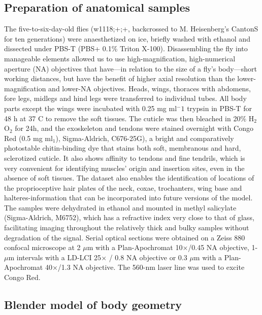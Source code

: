\documentclass[sn-mathphys-num]{sn-jnl}%
\theoremstyle{thmstyleone}%
\theoremstyle{thmstyletwo}%
\theoremstyle{thmstylethree}%
\begin{document}
\subsection{Preparation of anatomical samples}

The five-to-six-day-old flies (w1118;+;+, backcrossed to M. Heisenberg's CantonS for ten generations) were anaesthetized on ice, briefly washed with ethanol and dissected under PBS-T (PBS+ 0.1\% Triton X-100).
Disassembling the fly into manageable elements allowed us to use high-magnification, high-numerical aperture (NA) objectives that have—in relation to the size of a fly’s body—short working distances, but have the benefit of higher axial resolution than the lower-magnification and lower-NA objectives. 
Heads, wings, thoraces with abdomens, fore legs, midlegs and hind legs were transferred to individual tubes.
All body parts except the wings 
were incubated with 0.25 mg ml$ ^-1 $ trypsin in PBS-T for 48 h at 37 C to remove the soft tissues.
The cuticle was then bleached in 20\% H$ _2 $O$ _2 $ for 24h, and the exoskeleton and tendons were stained overnight with Congo Red (0.5 mg ml$ _1 $), Sigma-Aldrich, C676-25G), a bright and comparatively photostable chitin-binding dye that stains both soft, membranous and hard, sclerotized cuticle.
It also shows affinity to tendons and fine tendrils, which is very convenient for identifying muscles' origin and insertion sites, even in the absence of soft tissues.
The dataset also enables the identification of locations of the proprioceptive hair plates of the neck, coxae, trochanters, wing base and halteres-information that can be incorporated into future versions of the model. 
The samples were dehydrated in ethanol and mounted in methyl salicylate (Sigma-Aldrich, M6752), which has a refractive index very close to that of glass, facilitating imaging throughout the relatively thick and bulky samples without degradation of the signal. 
Serial optical sections were obtained on a Zeiss 880 confocal microscope at 2 $ \mu $m with a Plan-Apochromat 10×/0.45 NA objective, 1-$ \mu $m intervals with a LD-LCI 25$ \times $ / 0.8 NA objective or 0.3 $ \mu $m with a Plan-Apochromat 40×/1.3 NA objective. The 560-nm laser line was used to excite Congo Red.



\subsection{Blender model of body geometry} \label{sec:derivation}
\end{document}
